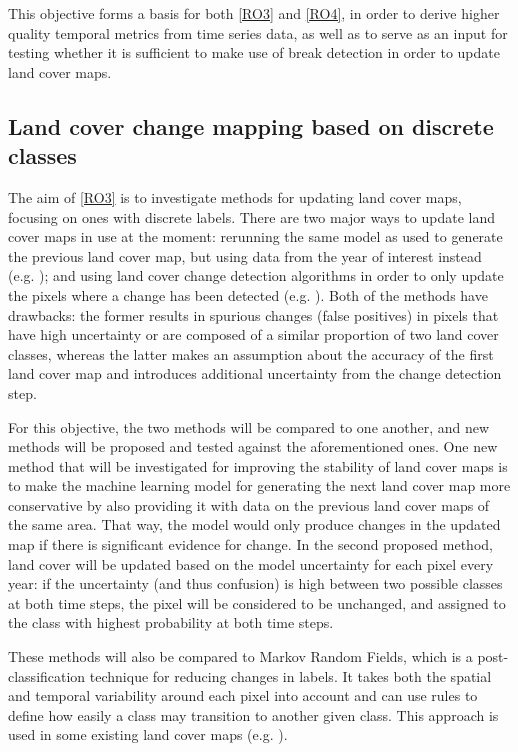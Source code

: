 \documentclass[10pt]{article}
\begin{document}
\begin{mdframed}[style=table,frametitle=\textbf{7. DETAILED DESCRIPTION OF THE RESEARCH PLAN} (max. 2500 words + 1 page literature list)]
This objective forms a basis for both \ref{RO3} and \ref{RO4}, in order to derive higher quality temporal metrics from time series data, as well as to serve as an input for testing whether it is sufficient to make use of break detection in order to update land cover maps.

\subsection{Land cover change mapping based on discrete classes}
The aim of \ref{RO3} is to investigate methods for updating land cover maps, focusing on ones with discrete labels. There are two major ways to update land cover maps in use at the moment: rerunning the same model as used to generate the previous land cover map, but using data from the year of interest instead (e.g. \citet{friedl_modis_2010}); and using land cover change detection algorithms in order to only update the pixels where a change has been detected (e.g. \citet{jin_land_2017}). Both of the methods have drawbacks: the former results in spurious changes (false positives) in pixels that have high uncertainty or are composed of a similar proportion of two land cover classes, whereas the latter makes an assumption about the accuracy of the first land cover map and introduces additional uncertainty from the change detection step.

For this objective, the two methods will be compared to one another, and new methods will be proposed and tested against the aforementioned ones. One new method that will be investigated for improving the stability of land cover maps is to make the machine learning model for generating the next land cover map more conservative by also providing it with data on the previous land cover maps of the same area. That way, the model would only produce changes in the updated map if there is significant evidence for change. In the second proposed method, land cover will be updated based on the model uncertainty for each pixel every year: if the uncertainty (and thus confusion) is high between two possible classes at both time steps, the pixel will be considered to be unchanged, and assigned to the class with highest probability at both time steps.

These methods will also be compared to Markov Random Fields, which is a post-classification technique for reducing changes in labels. It takes both the spatial and temporal variability around each pixel into account and can use rules to define how easily a class may transition to another given class. This approach is used in some existing land cover maps (e.g. \citet{cai_enhancing_2014}).


\end{mdframed}
\end{document}
